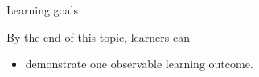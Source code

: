 
\begin{frame}{Learning goals}
  \begin{LearningGoals}{By the end of this topic, learners can}
    \begin{itemize}
      \item demonstrate one observable learning outcome.
    \end{itemize}
  \end{LearningGoals}
\end{frame}
